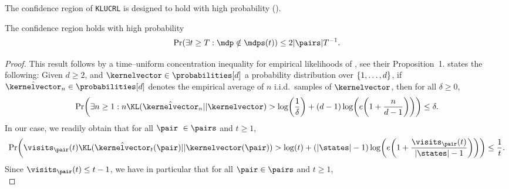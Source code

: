 \documentclass[preprint,cleveref,12pt]{colt2025}
\DeclarePairedDelimiter{\braces}{\{}{\}}	%
\DeclarePairedDelimiter{\parens}{(}{)}	%
\DeclarePairedDelimiter{\abs}{\lvert}{\rvert}	%
\def\model{\mdp}
\def\models{\mdps}
\def\kernel{\kernelvector}
\begin{document}
    The confidence region of \texttt{KLUCRL} is designed to hold with high probability (). 

    \begin{lemma}
    \label{lemma_confidence_region}
        The confidence region holds with high probability
        \begin{equation*}
            \Pr \parens*{
                \exists t \ge T:
                \model \notin \models(t)
            }
            \le
            2 \abs{\pairs} T^{-1}
            .
        \end{equation*}
    \end{lemma}
    \begin{proof}
        This result follows by a time--uniform concentration inequality for empirical likelihoods of \cite{jonsson2020planning}, see their Proposition~1.
        \cite[Proposition~1]{jonsson2020planning} states the following:
        Given $d \ge 2$, and $\kernel \in \probabilities[d]$ a probability distribution over $\braces{1, \ldots, d}$, if $\hat{\kernel}_n \in \probabilities[d]$ denotes the empirical average of $n$ i.i.d.~samples of $\kernel$, then for all $\delta \ge 0$, 
        \begin{equation*}
            \Pr \parens*{
                \exists n \ge 1
                :
                n \KL(\hat{\kernel}_n||\kernel)
                > 
                \log\parens*{\frac 1\delta}
                + 
                (d-1) \log \parens*{
                    e \parens*{
                        1 + \frac n{d-1}
                    }
                }
            }
            \le
            \delta
            .
        \end{equation*}
        In our case, we readily obtain that for all $\pair \in \pairs$ and $t \ge 1$,
        \begin{equation}
        \label{equation_proof_confidence_region_1}
            \Pr \parens*{
                \visits_\pair (t)
                \KL(\hat{\kernel}_t(\pair)||\kernel(\pair))
                >
                \log(t)
                + 
                (\abs{\states}-1)
                \log \parens*{
                    e \parens*{
                        1 + \frac{\visits_\pair(t)}{\abs{\states}-1}
                    }
                }
            }
            \le
            \frac 1t
            .
        \end{equation}
        Since $\visits_\pair (t) \le t-1$, we have in particular that for all $\pair \in \pairs$ and $t \ge 1$,
        \begin{equation}

\end{equation}
\end{proof}
\end{document}
